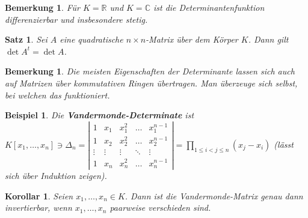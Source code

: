 \documentclass[12pt,a4paper]{article}
\theoremstyle{plain}
\newtheorem{Satz}[Theorem]{Satz}
\newtheorem{Korollar}[Theorem]{Korollar}
\newtheorem{Bemerkung}[Theorem]{Bemerkung}
\newtheorem{Beispiel}[Theorem]{Beispiel}
\numberwithin{equation}{section}
\begin{document}
\begin{Bemerkung}
Für $K=\mathbb R$ und $K=\mathbb C$ ist die Determinantenfunktion differenzierbar und insbesondere stetig.
\end{Bemerkung}
\begin{Satz}
Sei $A$ eine quadratische $n\times n$-Matrix über dem Körper $K$. Dann gilt $\det A^t=\det A$.
\end{Satz}
\begin{Bemerkung}
Die meisten Eigenschaften der Determinante lassen sich auch auf Matrizen über kommutativen Ringen übertragen. Man überzeuge sich selbst, bei welchen das funktioniert.
\end{Bemerkung}
\begin{Beispiel}
Die \textbf{Vandermonde-Determinate} ist\\ $K[x_1,\ldots,x_n]\ni\Delta_n=\left|\begin{matrix}
1 & x_1 & x_1^2 & \ldots & x_1^{n-1} \\
1 & x_2 & x_2^2 & \ldots & x_2^{n-1} \\
\vdots & \vdots & \vdots & \ddots & \vdots \\
1 & x_n & x^2_n & \ldots & x_n^{n-1}
\end{matrix} \right|=\prod_{1\leq i < j \leq n} (x_j-x_i) $ (lässt sich über Induktion zeigen).
\end{Beispiel}
\begin{Korollar}
Seien $x_1,\ldots,x_n\in K$. Dann ist die Vandermonde-Matrix genau dann invertierbar, wenn $x_1,\ldots,x_n$ paarweise verschieden sind.
\end{Korollar}
\end{document}
